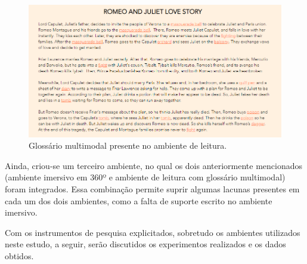 \begin{figure}[htpb]
    \centering
    \begin{minipage}{.75\textwidth}
    \includegraphics[width=\textwidth]{fig-03.png}
    \caption{Glossário multimodal presente no ambiente de leitura.}
    \label{fig-03}
    \end{minipage}
\end{figure}
Ainda, criou-se um terceiro ambiente, no qual os dois anteriormente
mencionados (ambiente imersivo em 360º e ambiente de leitura com
glossário multimodal) foram integrados. Essa combinação permite suprir
algumas lacunas presentes em cada um dos dois ambientes, como a falta de
suporte escrito no ambiente imersivo.

Com os instrumentos de pesquisa explicitados, sobretudo os ambientes
utilizados neste estudo, a seguir, serão discutidos os experimentos
realizados e os dados obtidos.

